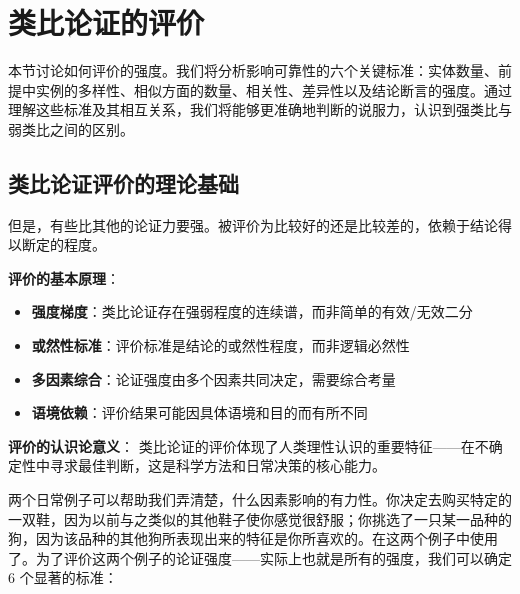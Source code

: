 \section{类比论证的评价}

\begin{logicbox}[title=引言]
本节讨论如何评价的强度。我们将分析影响可靠性的六个关键标准：实体数量、前提中实例的多样性、相似方面的数量、相关性、差异性以及结论断言的强度。通过理解这些标准及其相互关系，我们将能够更准确地判断的说服力，认识到强类比与弱类比之间的区别。
\end{logicbox}

\subsection{类比论证评价的理论基础}


\begin{theorembox}[title=类比论证的评价原理]
但是，有些比其他的论证力要强。被评价为比较好的还是比较差的，依赖于结论得以断定的程度。

\textbf{评价的基本原理}：
\begin{itemize}
\item \textbf{强度梯度}：类比论证存在强弱程度的连续谱，而非简单的有效/无效二分
\item \textbf{或然性标准}：评价标准是结论的或然性程度，而非逻辑必然性
\item \textbf{多因素综合}：论证强度由多个因素共同决定，需要综合考量
\item \textbf{语境依赖}：评价结果可能因具体语境和目的而有所不同
\end{itemize}

\textbf{评价的认识论意义}：
类比论证的评价体现了人类理性认识的重要特征——在不确定性中寻求最佳判断，这是科学方法和日常决策的核心能力。
\end{theorembox}

\begin{examplebox}[title=日常类比推理实例]
两个日常例子可以帮助我们弄清楚，什么因素影响的有力性。你决定去购买特定的一双鞋，因为以前与之类似的其他鞋子使你感觉很舒服；你挑选了一只某一品种的狗，因为该品种的其他狗所表现出来的特征是你所喜欢的。在这两个例子中使用了。为了评价这两个例子的论证强度——实际上也就是所有的强度，我们可以确定 6 个显著的标准：
\end{examplebox}

